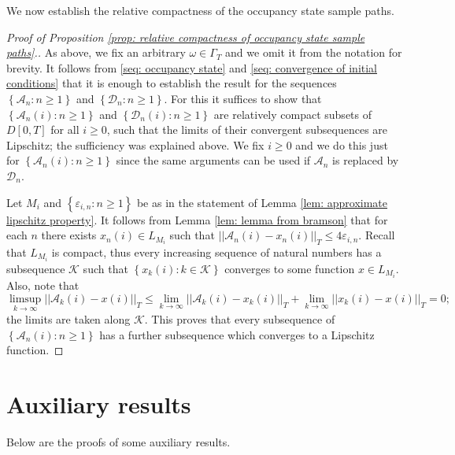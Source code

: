 \documentclass[a4paper, 12pt]{article}
\theoremstyle{definition}
\newcommand{\norm}[1]{\left|\left|#1\right|\right|}
\newcommand{\set}[2]{\left\{#1 : #2\right\}}
\newcommand{\calA}{\mathcal{A}}
\newcommand{\calD}{\mathcal{D}}
\newcommand{\calK}{\mathcal{K}}
\begin{document}
\begin{appendices}
	We now establish the relative compactness of the occupancy state sample paths.
	
	\begin{proof}[Proof of Proposition \ref{prop: relative compactness of occupancy state sample paths}.]
	As above, we fix an arbitrary $\omega \in \Gamma_T$ and we omit it from the notation for brevity. It follows from \eqref{seq: occupancy state} and \eqref{seq: convergence of initial conditions} that it is enough to establish the result for the sequences $\set{\calA_n}{n \geq 1}$ and $\set{\calD_n}{n \geq 1}$. For this it suffices to show that $\set{\calA_n(i)}{n \geq 1}$ and $\set{\calD_n(i)}{n \geq 1}$ are relatively compact subsets of $D[0, T]$ for all $i \geq 0$, such that the limits of their convergent subsequences are Lipschitz; the sufficiency was explained above. We fix $i \geq 0$ and we do this just for $\set{\calA_n(i)}{n \geq 1}$ since the same arguments can be used if $\calA_n$ is replaced by $\calD_n$.
	
	Let $M_i$ and $\set{\varepsilon_{i, n}}{n \geq 1}$ be as in the statement of Lemma \ref{lem: approximate lipschitz property}. It follows from Lemma \ref{lem: lemma from bramson} that for each $n$ there exists $x_n(i) \in L_{M_i}$ such that $\norm{\calA_n(i) - x_n(i)}_T \leq 4\varepsilon_{i, n}$. Recall that $L_{M_i}$ is compact, thus every increasing sequence of natural numbers has a subsequence $\calK$ such that $\set{x_k(i)}{k \in \calK}$ converges to some function $x \in L_{M_i}$. Also, note that
	\begin{equation*}
		\limsup_{k \to \infty} \norm{\calA_k(i) - x(i)}_T \leq \lim_{k \to \infty} \norm{\calA_k(i) - x_k(i)}_T + \lim_{k \to \infty} \norm{x_k(i) - x(i)}_T = 0;
	\end{equation*}
	the limits are taken along $\calK$. This proves that every subsequence of $\set{\calA_n(i)}{n \geq 1}$ has a further subsequence which converges to a Lipschitz function.
	\end{proof}
	
	\section{Auxiliary results}
	\label{app: auxiliary results}
	
	Below are the proofs of some auxiliary results.
	

\end{appendices}
\end{document}
